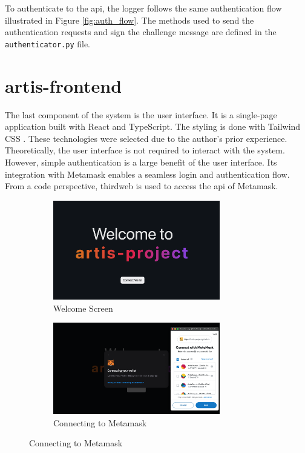 To authenticate to the \gls{api}, the logger follows the same authentication flow illustrated in Figure \ref{fig:auth_flow}. The methods used to send the authentication requests and sign the challenge message are defined in the \texttt{authenticator.py} file.

\clearpage
\section{artis-frontend}
The last component of the system is the user interface. It is a single-page application built with React \cite{react} and TypeScript. The styling is done with Tailwind CSS \cite{tailwindcss}. These technologies were selected due to the author's prior experience. Theoretically, the user interface is not required to interact with the system. However, simple authentication is a large benefit of the user interface. Its integration with Metamask \cite{metamask} enables a seamless login and authentication flow. From a code perspective, thirdweb \cite{thirdweb} is used to access the \gls{api} of Metamask.

\begin{figure}[h]
    \centering
    \begin{subfigure}{\textwidth}
        \centering
        \includegraphics[width=0.8\textwidth]{resources/frontend_screenshots/welcome_screen.png}
        \caption{Welcome Screen}
        \label{fig:welcome_screen}
        \vspace*{2mm}
    \end{subfigure}
    \begin{subfigure}{\textwidth}
        \centering
        \includegraphics[width=0.8\textwidth]{resources/frontend_screenshots/connecting_wallet.png}
        \caption{Connecting to Metamask}
        \label{fig:connecting_metamask}
    \end{subfigure}
\end{figure}

